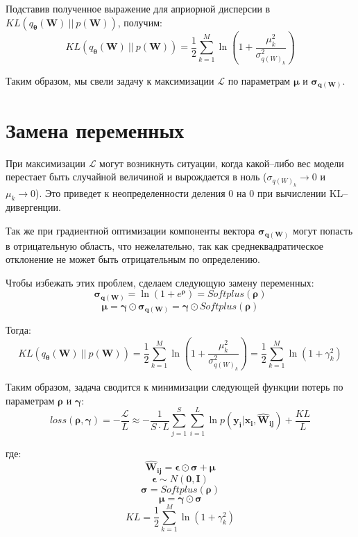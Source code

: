 \documentclass{article}
\begin{document}
    Подставив полученное выражение для априорной дисперсии в $KL(q_{\pmb{\theta}}(\pmb{W})~||~p(\pmb{W}))$, получим:
    \[
    KL(q_{\pmb{\theta}}(\pmb{W})~||~p(\pmb{W})) =
    \dfrac{1}{2}\sum_{k=1}^{M}\ln({1 + \dfrac{\mu_{k}^2}{\sigma_{{q(W)_{k}}}^2}})
    \]

    Таким образом, мы свели задачу к максимизации $\mathcal{L}$ по параметрам $\pmb{\mu}$ и $\pmb{\sigma_{q(W)}}$.

    \section{Замена переменных}

    При максимизации $\mathcal{L}$ могут возникнуть ситуации, когда какой--либо вес модели перестает быть случайной величиной и вырождается в ноль ($\sigma_{{q(W)_{k}}} \rightarrow 0$ и $\mu_{k} \rightarrow 0$). Это приведет к неопределенности деления 0 на 0 при вычислении KL--дивергенции.

    Так же при градиентной оптимизации компоненты вектора $\pmb{\sigma_{q(\pmb{W})}}$ могут попасть в отрицательную область, что нежелательно, так как среднеквадратическое отклонение не может быть отрицательным по определению.

    Чтобы избежать этих проблем, сделаем следующую замену переменных:
    \[
    \pmb{\sigma_{q(\pmb{W})}} = \ln({1 + e^{\pmb{\rho}}}) = Softplus (\pmb{\rho})
    \]\[
    \pmb{\mu} = \pmb{\gamma} \odot \pmb{\sigma_{q(\pmb{W})}} = \pmb{\gamma} \odot Softplus (\pmb{\rho})
    \]

    Тогда:
    \[
    KL(q_{\pmb{\theta}}(\pmb{W})~||~p(\pmb{W})) =
    \dfrac{1}{2}\sum_{k=1}^{M}\ln({1 + \dfrac{\mu_{k}^2}{\sigma_{{q(W)_{k}}}^2}}) =
    \dfrac{1}{2}\sum_{k=1}^{M}\ln({1 + \gamma_{k}^{2}})
    \]

    Таким образом, задача сводится к минимизации следующей функции потерь по параметрам $\pmb{\rho}$ и $\pmb{\gamma}$:
    \[
    loss(\pmb{\rho}, \pmb{\gamma}) =
    - \dfrac{\mathcal{L}}{L} \approx
    -\dfrac{1}{S \cdot L} \sum_{j=1}^S \sum_{i=1}^{L}  {\ln{p(\pmb{y_{i}} | \pmb{x_{i}}, \pmb{\hat{W}_{ij}})}} + \dfrac{KL}{L}
    \]

    где:
    \[
    \pmb{\hat{W}_{ij}} = \pmb{\epsilon} \odot \pmb{\sigma} + \pmb{\mu}
    \]
    \[
    \pmb{\epsilon} \sim N(\pmb{0}, \pmb{I})
    \]
    \[
    \pmb{\sigma} = Softplus(\pmb{\rho})
    \]
    \[
    \pmb{\mu} = \pmb{\gamma} \odot \pmb{\sigma}
    \]
    \[
    KL = \dfrac{1}{2}\sum_{k=1}^{M}\ln({1 + \gamma_{k}^{2}})
    \]
\end{document}
